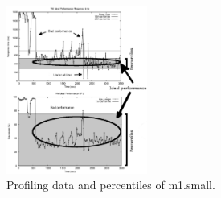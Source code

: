 \begin{figure}[t]
  \begin{center}
    \includegraphics[width=0.8\linewidth, height=5.5cm]{images/idealSmallRemark.pdf}
  \end{center}
\vspace{-4mm}
  \caption{Profiling data and percentiles of m1.small.}
  \label{fig:vm_performance1}
\end{figure}



